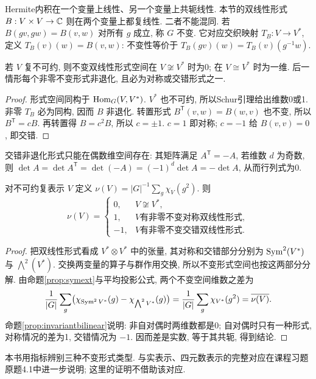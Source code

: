 Hermite内积在一个变量上线性、另一个变量上共轭线性. 本节的双线性形式 $B:V\times V\to\mathbb C$ 则在两个变量上都复线性. 二者不能混同. 若 $B(gv,gw)=B(v,w)$ 对所有 $g$ 成立, 称 $G$ 不变. 它对应交织映射 $T_B:V\to V^*$, 定义 $T_B(v)(w)=B(v,w)$: 不变性等价于 $T_B(gv)(w)=T_B(v)(g^{-1}w)$.

\begin{proposition}\label{prop:invariantbilinear}
若 $V$ 复不可约, 则不变双线性形式空间在 $V\not\cong V^*$ 时为0; 在 $V\cong V^*$ 时为一维. 后一情形每个非零不变形式非退化, 且必为对称或交错形式之一.
\end{proposition}
\begin{proof}
形式空间同构于 $\operatorname{Hom}_G(V,V^*)$. $V^*$ 也不可约, 所以Schur引理给出维数0或1. 非零 $T_B$ 必为同构, 因而 $B$ 非退化. 转置形式 $B^{\mathsf T}(v,w)=B(w,v)$ 也不变, 所以 $B^{\mathsf T}=cB$. 再转置得 $B=c^2B$, 所以 $c=\pm1$. $c=1$ 即对称; $c=-1$ 给 $B(v,v)=0$, 即交错.
\end{proof}
交错非退化形式只能在偶数维空间存在: 其矩阵满足 $A^{\mathsf T}=-A$, 若维数 $d$ 为奇数, 则 $\det A=\det A^{\mathsf T}=\det(-A)=(-1)^d\det A=-\det A$, 从而行列式为0.

\begin{theorem}\label{thm:fs}
对不可约复表示 $V$ 定义 $\nu(V)=|G|^{-1}\sum_g\chi_V(g^2)$. 则
\[
 \nu(V)=\begin{cases}
 0,&V\not\cong V^*,\\
 1,&V\text{有非零不变对称双线性形式},\\
 -1,&V\text{有非零不变交错双线性形式}.
 \end{cases}
\]
\end{theorem}
\begin{proof}
把双线性形式看成 $V^*\otimes V^*$ 中的张量, 其对称和交错部分分别为 $\operatorname{Sym}^2(V^*)$ 与 $\bigwedge^2(V^*)$. 交换两变量的算子与群作用交换, 所以不变形式空间也按这两部分分解. 由命题\ref{prop:symext}与平均投影公式, 两个不变空间维数之差为
\[
 \frac1{|G|}\sum_g\bigl(\chi_{\operatorname{Sym}^2 V^*}(g)-\chi_{\bigwedge^2 V^*}(g)\bigr)
 =\frac1{|G|}\sum_g\chi_{V^*}(g^2)=\overline{\nu(V)}.
\]
命题\ref{prop:invariantbilinear}说明: 非自对偶时两维数都是0; 自对偶时只有一种形式, 对称情况的差为1, 交错情况为 $-1$. 因而差是实数, 等于其共轭, 得到结论.
\end{proof}
本书用指标辨别三种不变形式类型. 与实表示、四元数表示的完整对应在课程习题原题4.1中进一步说明; 这里的证明不借助该对应.


